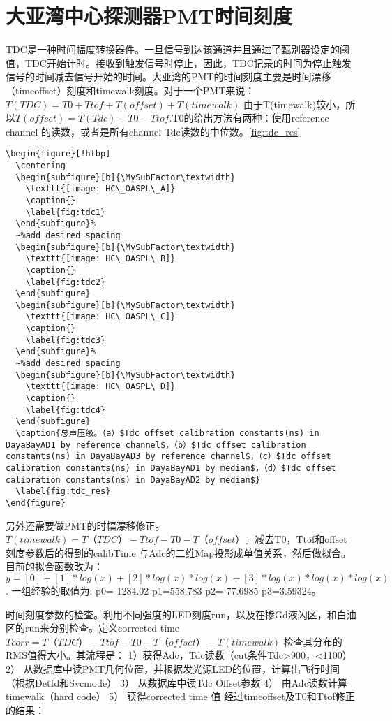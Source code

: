 \section{大亚湾中心探测器PMT时间刻度}
TDC是一种时间幅度转换器件。一旦信号到达该通道并且通过了甄别器设定的阈值，TDC开始计时。接收到触发信号时停止，因此，TDC记录的时间为停止触发信号的时间减去信号开始的时间。大亚湾的PMT的时间刻度主要是时间漂移（timeoffset）刻度和timewalk刻度。对于一个PMT来说：$ T(TDC)=T0+Ttof+T(offset)+T(timewalk) $ 由于T(timewalk)较小，所以$T(offset)=T(Tdc)-T0-Ttof$.T0的给出方法有两种：使用reference channel 的读数，或者是所有channel Tdc读数的中位数。\ref{fig:tdc_res}
\begin{verbatim}
\begin{figure}[!htbp]
  \centering
  \begin{subfigure}[b]{\MySubFactor\textwidth}
    \texttt{[image: HC\_OASPL\_A]}
    \caption{}
    \label{fig:tdc1}
  \end{subfigure}%
  ~%add desired spacing
  \begin{subfigure}[b]{\MySubFactor\textwidth}
    \texttt{[image: HC\_OASPL\_B]}
    \caption{}
    \label{fig:tdc2}
  \end{subfigure}
  \begin{subfigure}[b]{\MySubFactor\textwidth}
    \texttt{[image: HC\_OASPL\_C]}
    \caption{}
    \label{fig:tdc3}
  \end{subfigure}%
  ~%add desired spacing
  \begin{subfigure}[b]{\MySubFactor\textwidth}
    \texttt{[image: HC\_OASPL\_D]}
    \caption{}
    \label{fig:tdc4}
  \end{subfigure}
  \caption{总声压级。（a）$Tdc offset calibration constants(ns) in DayaBayAD1 by reference channel$，（b）$Tdc offset calibration constants(ns) in DayaBayAD3 by reference channel$，（c）$Tdc offset calibration constants(ns) in DayaBayAD1 by median$，（d）$Tdc offset calibration constants(ns) in DayaBayAD2 by median$}
  \label{fig:tdc_res}
\end{figure}
\end{verbatim}
另外还需要做PMT的时幅漂移修正。$T(timewalk)=T（TDC）-Ttof-T0-T（offset）$。减去T0，Ttof和offset 刻度参数后的得到的calibTime
与Adc的二维Map投影成单值关系，然后做拟合。目前的拟合函数改为：$ y=[0]+[1]*log(x)+[2]*log(x)*log(x)+[3]*log(x)*log(x)*log(x) $ . 一组经验的取值为: p0=-1284.02 p1=558.783 p2=-77.6985 p3=3.59324。

时间刻度参数的检查。利用不同强度的LED刻度run，以及在掺Gd液闪区，和白油区的run来分别检查。定义corrected time $Tcorr=T（TDC）-Ttof-T0-T（offset）-T(timewalk) $ 检查其分布的RMS值得大小。其流程是：
1）获得Adc，Tdc读数（cut条件Tdc>900，<1100）
2） 从数据库中读PMT几何位置，并根据发光源LED的位置，计算出飞行时间（根据DetId和Svcmode）
3） 从数据库中读Tdc Offset参数
4） 由Adc读数计算timewalk（hard code）
5） 获得corrected time 值
经过timeoffset及T0和Ttof修正的结果：

